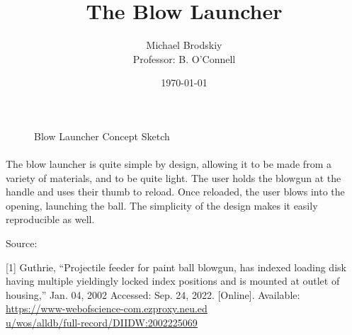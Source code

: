 


\title{The Blow Launcher}
\date{\today}
\author{Michael Brodskiy\\ \small Professor: B. O'Connell}



\maketitle

\begin{figure}[h!]
  \centering
  
  \caption{Blow Launcher Concept Sketch}
  \label{fig:1}
\end{figure}

\paragraph{} The blow launcher is quite simple by design, allowing it to be made from a variety of materials, and to be quite light. The user holds the blowgun at the handle and uses their thumb to reload. Once reloaded, the user blows into the opening, launching the ball. The simplicity of the design makes it easily reproducible as well.

\newline
\vspace{25pt}

Source:

[1] Guthrie, “Projectile feeder for paint ball blowgun, has indexed loading disk having multiple yieldingly locked index positions and is mounted at outlet of housing,” Jan. 04, 2002 Accessed: Sep. 24, 2022. [Online]. Available: \href{https://www-webofscience-com.ezproxy.neu.edu/wos/alldb/full-record/DIIDW:2002225069}{https://www-webofscience-com.ezproxy.neu.ed\\u/wos/alldb/full-record/DIIDW:2002225069}



